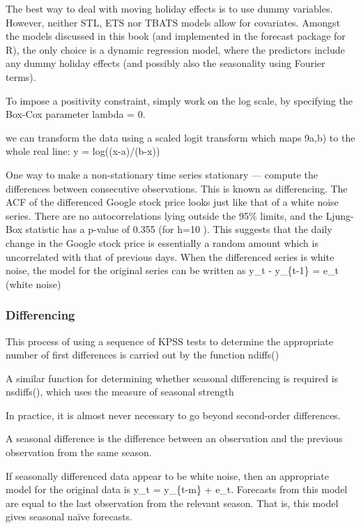 \documentclass[]{book}
\begin{document}
The best way to deal with moving holiday effects is to use dummy variables. However, neither STL, ETS nor TBATS models allow for covariates. Amongst the models discussed in this book (and implemented in the forecast package for R), the only choice is a dynamic regression model, where the predictors include any dummy holiday effects (and possibly also the seasonality using Fourier terms).

To impose a positivity constraint, simply work on the log scale, by specifying the Box-Cox parameter lambda = 0.

we can transform the data using a scaled logit transform which maps 9a,b) to the whole real line: y = log((x-a)/(b-x))

One way to make a non-stationary time series stationary --- compute the differences between consecutive observations. This is known as differencing. The ACF of the differenced Google stock price looks just like that of a white noise series. There are no autocorrelations lying outside the 95\% limits, and the Ljung-Box statistic has a p-value of 0.355 (for h=10 ). This suggests that the daily change in the Google stock price is essentially a random amount which is uncorrelated with that of previous days. When the differenced series is white noise, the model for the original series can be written as y\_t - y\_\{t-1\} = e\_t (white noise)

\hypertarget{differencing}{%
\subsubsection{Differencing}\label{differencing}}

This process of using a sequence of KPSS tests to determine the appropriate number of first differences is carried out by the function ndiffs()

A similar function for determining whether seasonal differencing is required is nsdiffs(), which uses the measure of seasonal strength

In practice, it is almost never necessary to go beyond second-order differences.

A seasonal difference is the difference between an observation and the previous observation from the same season.

If seasonally differenced data appear to be white noise, then an appropriate model for the original data is y\_t = y\_\{t-m\} + e\_t. Forecasts from this model are equal to the last observation from the relevant season. That is, this model gives seasonal naïve forecasts.
\end{document}
